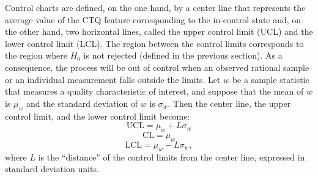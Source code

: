 Control charts are defined, on the one hand, by a center line that represents the average value of the CTQ feature corresponding to the in-control state and, on the other hand, two horizontal lines, called the upper control limit (UCL) and the lower control limit (LCL). The region between the control limits corresponds to the region where $H_0$ is not rejected (defined in the previous section). As a consequence, the process will be out of control when an observed rational sample or an individual measurement falls outside the limits. 
Let $w$ be a sample statistic that measures a quality characteristic of interest, and suppose that the mean of $w$ is $\mu_w$ and the standard deviation  of $w$ is $\sigma_w$. Then the center line, the upper control limit, and the lower control limit become:
$$\mbox{UCL}=\mu_w + L \sigma_w$$ 
$$\mbox{CL}=\mu_w$$ 
$$\mbox{LCL}=\mu_w - L \sigma_w,$$ 
where $L$ is the ``distance'' of the control limits from the center line, expressed in standard deviation units.\\
